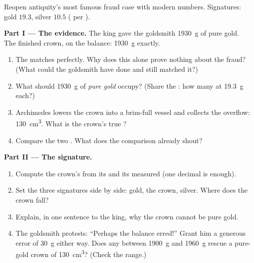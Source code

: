 \begin{problem}\label{pb:g6:density-floating:1}
Reopen antiquity's most famous fraud case with modern numbers.
Signatures: gold $19.3$, silver $10.5$ ( per ).

\medskip\noindent\textbf{Part I --- The evidence.}
The king gave the goldsmith \qty{1930}{g} of pure gold. The
finished crown, on the balance: \qty{1930}{g} exactly.
\begin{enumerate}
  \item The  matches perfectly. Why does this alone prove
        nothing about the fraud? (What could the goldsmith have
        done and still matched it?)
  \item What  should \qty{1930}{g} of \emph{pure gold}
        occupy? (Share the : how many  at
        \qty{19.3}{g} each?)
  \item Archimedes lowers the crown into a brim-full vessel and
        collects the overflow: \qty{130}{cm^3}. What is the
        crown's true ?
  \item Compare the two . What does the comparison already
        shout?
\end{enumerate}

\medskip\noindent\textbf{Part II --- The signature.}
\begin{enumerate}[resume]
  \item Compute the crown's  from its  and its
        measured  (one decimal is enough).
  \item Set the three signatures side by side: gold, the crown,
        silver. Where does the crown fall?
  \item Explain, in one sentence to the king, why the crown
        cannot be pure gold.
  \item The goldsmith protests: ``Perhaps the balance erred!''
        Grant him a generous error of \qty{30}{g} either way.
        Does any  between \qty{1900}{g} and \qty{1960}{g}
        rescue a pure-gold crown of  \qty{130}{cm^3}?
        (Check the  range.)
\end{enumerate}


\end{problem}
